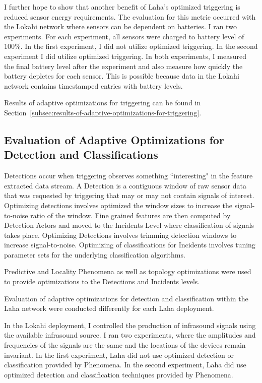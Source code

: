 I further hope to show that another benefit of Laha's optimized triggering is reduced sensor energy requirements. The evaluation for this metric occurred with the Lokahi network where sensors can be dependent on batteries. I ran two experiments. For each experiment, all sensors were charged to battery level of 100\%. In the first experiment, I did not utilize optimized triggering. In the second experiment I did utilize optimized triggering. In both experiments, I measured the final battery level after the experiment and also measure how quickly the battery depletes for each sensor. This is possible because data in the Lokahi network contains timestamped entries with battery levels.

Results of adaptive optimizations for triggering can be found in Section~\ref{subsec:results-of-adaptive-optimizations-for-triggering}.

\subsection{Evaluation of Adaptive Optimizations for Detection and Classifications}\label{subsec:evaluation-of-adaptive-optimizations-for-detection-and-classifications}
Detections occur when triggering observes something ``interesting" in the feature extracted data stream. A Detection is a contiguous window of raw sensor data that was requested by triggering that may or may not contain signals of interest. Optimizing detections involves optimized the window sizes to increase the signal-to-noise ratio of the window. Fine grained features are then computed by Detection Actors and moved to the Incidents Level where classification of signals takes place. Optimizing Detections involves trimming detection windows to increase signal-to-noise. Optimizing of classifications for Incidents involves tuning parameter sets for the underlying classification algorithms.

Predictive and Locality Phenomena as well as topology optimizations were used to provide optimizations to the Detections and Incidents levels.

Evaluation of adaptive optimizations for detection and classification within the Laha network were conducted differently for each Laha deployment.

In the Lokahi deployment, I controlled the production of infrasound signals using the available infrasound source. I ran two experiments, where the amplitudes and frequencies of the signals are the same and the locations of the devices remain invariant. In the first experiment, Laha did not use optimized detection or classification provided by Phenomena. In the second experiment, Laha did use optimized detection and classification techniques provided by Phenomena.

